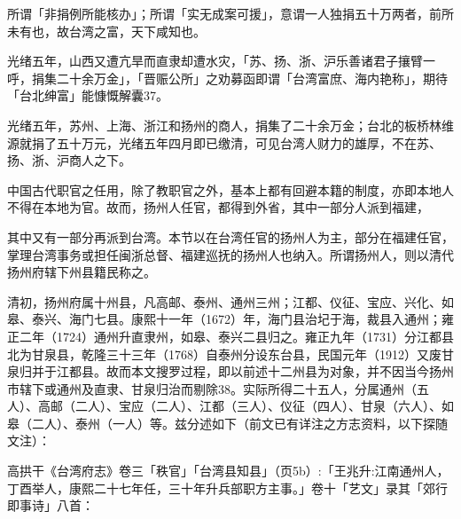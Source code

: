 所谓「非捐例所能核办」；所谓「实无成案可援」，意谓一人独捐五十万两者，前所未有也，故台湾之富，天下咸知也。

光绪五年，山西又遭亢旱而直隶却遭水灾，「苏、扬、浙、沪乐善诸君子攘臂一呼，捐集二十余万金」，「晋赈公所」之劝募函即谓「台湾富庶、海内艳称」，期待「台北绅富」能慷慨解囊37。

光绪五年，苏州、上海、浙江和扬州的商人，捐集了二十余万金；台北的板桥林维源就捐了五十万元，光绪五年四月即已缴清，可见台湾人财力的雄厚，不在苏、扬、浙、沪商人之下。


中国古代职官之任用，除了教职官之外，基本上都有回避本籍的制度，亦即本地人不得在本地为官。故而，扬州人任官，都得到外省，其中一部分人派到福建，

\vfill
\begin{BookNotes}
\end{BookNotes}

\noindent 其中又有一部分再派到台湾。本节以在台湾任官的扬州人为主，部分在福建任官，掌理台湾事务或担任闽浙总督、福建巡抚的扬州人也纳入。所谓扬州人，则以清代扬州府辖下州县籍民称之。

清初，扬州府属十州县，凡高邮、泰州、通州三州；江都、仪征、宝应、兴化、如皋、泰兴、海门七县。康熙十一年（1672）年，海门县治圮于海，裁县入通州；雍正二年（1724）通州升直隶州，如皋、泰兴二县归之。雍正九年（1731）分江都县北为甘泉县，乾隆三十三年（1768）自泰州分设东台县，民国元年（1912）又废甘泉归并于江都县。故而本文搜罗过程，即以前述十二州县为对象，并不因当今扬州市辖下或通州及直隶、甘泉归治而剔除38。实际所得二十五人，分属通州（五人）、高邮（二人）、宝应（二人）、江都（三人）、仪征（四人）、甘泉（六人）、如皋（二人）、泰州（一人）等。兹分述如下（前文已有详注之方志资料，以下探随文注）：


高拱干《台湾府志》卷三「秩官」「台湾县知县」（页5b）:「王兆升:江南通州人，丁酉举人，康熙二十七年任，三十年升兵部职方主事。」卷十「艺文」录其「郊行即事诗」八首：

